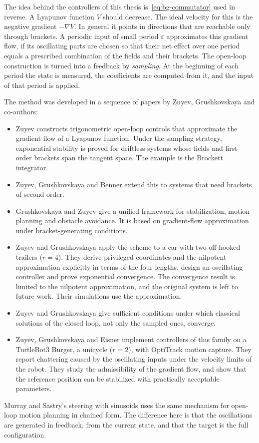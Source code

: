 The idea behind the controllers of this thesis is~\eqref{eq:bg-commutator} used
in reverse. A Lyapunov function $V$ should decrease. The ideal velocity for this
is the negative gradient $-\nabla V$. In general it points in directions that
are reachable only through brackets. A periodic input of small period
$\varepsilon$ approximates this gradient flow, if its oscillating parts are
chosen so that their net effect over one period equals a prescribed combination
of the fields and their brackets. The open-loop construction is turned into a
feedback by \emph{sampling}. At the beginning of each period the state is
measured, the coefficients are computed from it, and the input of that period
is applied.

The method was developed in a sequence of papers by Zuyev, Grushkovskaya and
co-authors:
\begin{itemize}
  \item Zuyev \cite{zuyev2015} constructs trigonometric open-loop controls that
        approximate the gradient flow of a Lyapunov function. Under the
        sampling strategy, exponential stability is proved for driftless
        systems whose fields and first-order brackets span the tangent space.
        The example is the Brockett integrator.
  \item Zuyev, Grushkovskaya and Benner \cite{zuyev2016} extend this to
        systems that need brackets of second order.
  \item Grushkovskaya and Zuyev \cite{grushkovskaya2023} give a unified
        framework for stabilization, motion planning and obstacle avoidance.
        It is based on gradient-flow approximation under bracket-generating
        conditions.
  \item Zuyev and Grushkovskaya \cite{zuyev2024} apply the scheme to a car
        with two off-hooked trailers ($r=4$). They derive privileged coordinates
        and the nilpotent approximation explicitly in terms of the four
        lengths, design an oscillating controller and prove exponential
        convergence. The convergence result is limited to the nilpotent
        approximation, and the original system is left to future work. Their
        simulations use the approximation.
  \item Zuyev and Grushkovskaya \cite{zuyev2025classical} give sufficient
        conditions under which classical solutions of the closed loop, not
        only the sampled ones, converge.
  \item Zuyev, Grushkovskaya and Eisner \cite{zuyev2026implementation}
        implement controllers of this family on a TurtleBot3 Burger, a unicycle
        ($r=2$), with OptiTrack motion capture. They report chattering caused by
        the oscillating inputs under the velocity limits of the robot. They study
        the admissibility of the gradient flow, and show that the reference
        position can be stabilized with practically acceptable parameters.
\end{itemize}
Murray and Sastry's steering with sinusoids \cite{murray1993} uses the same
mechanism for open-loop motion planning in chained form. The difference here is
that the oscillations are generated in feedback, from the current state, and
that the target is the full configuration.

